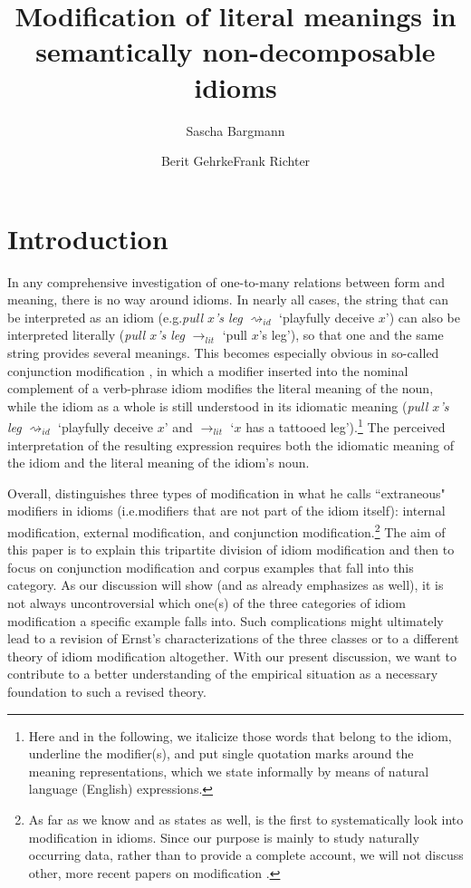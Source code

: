 \documentclass[output=paper]{langsci/langscibook}
\title{Modification of literal meanings in semantically non-decomposable idioms}
\author{Sascha Bargmann\affiliation{Goethe-Universität Frankfurt a.M.}\and Berit Gehrke\affiliation{Humboldt Universität zu Berlin}\lastand Frank Richter\affiliation{Goethe-Universität Frankfurt a.M.}}
\begin{document}
\maketitle



\section{Introduction}
In any comprehensive investigation of one-to-many relations between
form and meaning, there is no way around idioms. In nearly all cases,
the string that can be interpreted as an idiom (e.g.\@ \textit{pull
  $x$'s leg} $\rightsquigarrow_{id}$ `playfully deceive $x$') can also
be interpreted literally (\textit{pull $x$'s leg} $\rightarrow_{lit}$
`pull $x$'s leg'), so that one and the same string provides several
meanings. This becomes especially obvious in so-called conjunction
modification \citep{ernst81}, in which a modifier inserted into the
nominal complement of a verb-phrase idiom modifies the literal meaning
of the noun, while the idiom as a whole is still understood in its
idiomatic meaning (\textit{pull $x$'s} \underline{}
\textit{leg} $\rightsquigarrow_{id}$ `playfully deceive $x$' and
$\rightarrow_{lit}$ `$x$ has a tattooed leg').\footnote{Here and in
  the following, we italicize those words that belong to the idiom,
  underline the modifier(s), and put single quotation marks around the
  meaning representations, which we state informally by means of
  natural language (English) expressions.}
The perceived interpretation of the resulting expression requires both the idiomatic meaning of the idiom and the literal meaning of the idiom's noun.

Overall, \cite{ernst81} distinguishes three types of modification in what he calls ``extraneous" modifiers in idioms (i.e.\@ modifiers that are not part of the idiom itself): internal modification, external modification, and conjunction modification.\footnote{As far as we know and as \cite[83]{stathi07} states as well, \cite{ernst81} is the first to systematically look into modification in idioms. Since our purpose is mainly to study naturally occurring data, rather than to provide a complete account, we will not discuss other, more recent papers on modification \citep[see, for instance,][]{stathi07, cserep10, mcclure11, sailer17}.}
The aim of this paper is to explain this tripartite division of idiom modification and then to focus on conjunction modification and corpus examples that fall into this category. As our discussion will show (and as \citealt{ernst81} already emphasizes as well), it is not always uncontroversial %
which one(s) of the three categories of idiom modification a specific example falls into. Such complications might ultimately lead to a revision of Ernst's characterizations of the three classes or to a different theory of idiom modification altogether. With our present discussion, we want to contribute to a better understanding of the empirical situation as a necessary foundation to such a revised theory.
\end{document}
